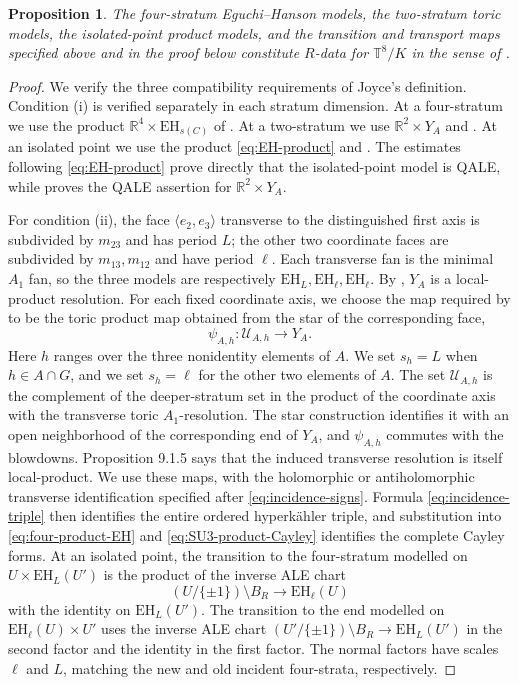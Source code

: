 \documentclass[11pt]{article}
\newtheorem{proposition}[theorem]{Proposition}
\theoremstyle{remark}\newtheorem{remark}[theorem]{Remark}
\newcommand{\EH}{\mathrm{EH}}
\newcommand{\T}{\mathbb T}
\newcommand{\R}{\mathbb R}
\begin{document}
\begin{proposition}\label{prop:R-data}
The four-stratum Eguchi--Hanson models, the two-stratum toric models, the
isolated-point product models, and the transition and transport maps
specified above and in the proof below constitute $R$-data for
$\T^8/K$ in the sense of
\cite[Definition 13.2.2]{JoyceBook}.
\end{proposition}
\begin{proof}
We verify the three compatibility requirements of Joyce's definition.
Condition (i) is verified separately in each stratum dimension.  At a
four-stratum we use the product $\R^4\times\EH_{s(C)}$ of
\cite[Proposition 13.1.1]{JoyceBook}.  At a two-stratum we use
$\R^2\times Y_A$ and \cite[Proposition 13.1.2]{JoyceBook}.  At an isolated
point we use the product \eqref{eq:EH-product} and
\cite[Proposition 13.1.4]{JoyceBook}.  The estimates following
\eqref{eq:EH-product} prove directly that the isolated-point model is
QALE, while \cite[Theorem 13.1.10(a)]{JoyceBook} proves the QALE assertion
for $\R^2\times Y_A$.

For condition (ii), the face $\langle e_2,e_3\rangle$ transverse to the
distinguished first axis is subdivided by $m_{23}$ and has period $L$; the
other two coordinate faces are subdivided by $m_{13},m_{12}$ and have
period $\ell$.  Each transverse fan is the minimal $A_1$ fan, so the three
models are respectively $\EH_L,\EH_\ell,\EH_\ell$.
By \cite[Proposition 9.1.4]{JoyceBook}, $Y_A$ is a local-product
resolution.  For each fixed coordinate axis, we choose the map required
by \cite[Definition 9.1.2]{JoyceBook} to be the toric product map obtained
from the star of the corresponding face,
\begin{equation}\label{eq:axis-product-map}
 \psi_{A,h}:
 \mathcal U_{A,h}
 \longrightarrow Y_A.
\end{equation}
Here $h$ ranges over the three nonidentity elements of $A$.  We set
$s_h=L$ when $h\in A\cap G$, and we set $s_h=\ell$ for the other two
elements of $A$.  The set $\mathcal U_{A,h}$ is the complement of the
deeper-stratum set in the product of the coordinate axis with the
transverse toric $A_1$-resolution.  The star construction identifies it
with an open neighborhood of the corresponding end of $Y_A$, and
$\psi_{A,h}$ commutes with the blowdowns.  Proposition 9.1.5 says that
the induced transverse resolution is itself local-product.  We use these
maps, with the holomorphic or
antiholomorphic transverse identification specified after
\eqref{eq:incidence-signs}.  Formula \eqref{eq:incidence-triple} then
identifies the entire ordered hyperk\"ahler triple, and substitution into
\eqref{eq:four-product-EH} and \eqref{eq:SU3-product-Cayley} identifies the
complete Cayley forms.  At an isolated point, the transition to the
four-stratum modelled on $U\times\EH_L(U')$ is the product of the inverse
ALE chart
\[
 (U/\{\pm1\})\setminus B_R\longrightarrow\EH_\ell(U)
\]
with the identity on $\EH_L(U')$.  The transition to the end modelled on
$\EH_\ell(U)\times U'$ uses the inverse ALE chart
$(U'/\{\pm1\})\setminus B_R\to\EH_L(U')$ in the second factor and the
identity in the first factor.  The normal factors have scales $\ell$ and
$L$, matching the new and old incident four-strata, respectively.


\end{proof}
\end{document}
